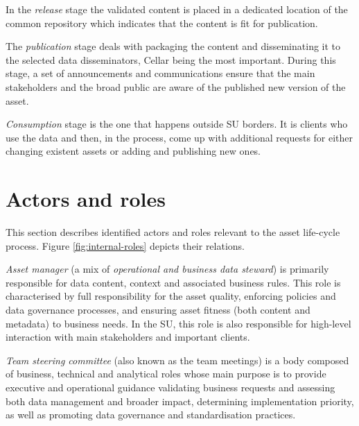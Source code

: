	In the \textit{release} stage the validated content is placed in a dedicated location of the common repository which indicates that the content is fit for publication. 
	
	The \textit{publication} stage deals with packaging the content and disseminating it to the selected data disseminators, Cellar being the most important. During this stage, a set of announcements and communications ensure that the main stakeholders and the broad public are aware of the published new version of the asset. 
	
	\textit{Consumption} stage is the one that happens outside SU borders. It is clients who use the data and then, in the process, come up with additional requests for either changing existent assets or adding and publishing new ones. 
	
	\section{Actors and roles}
	\label{sec:lifecycle-roles}	
	
	This section describes identified actors and roles relevant to the asset life-cycle process. Figure \ref{fig:internal-roles} depicts their relations.
		
	\textit{Asset manager} (a mix of \textit{operational and business data steward}) is primarily responsible for data content, context and associated business rules. This role is characterised by full responsibility for the asset quality, enforcing policies and data governance processes, and ensuring asset fitness (both content and metadata) to business needs. In the SU, this role is also responsible for high-level interaction with main stakeholders and important clients.
	
	\textit{Team steering committee} (also known as the team meetings) is a body composed of business, technical and analytical roles whose main purpose is to provide executive and operational guidance validating business requests and assessing both data management and broader impact, determining implementation priority, as well as promoting data governance and standardisation practices.
	
	
